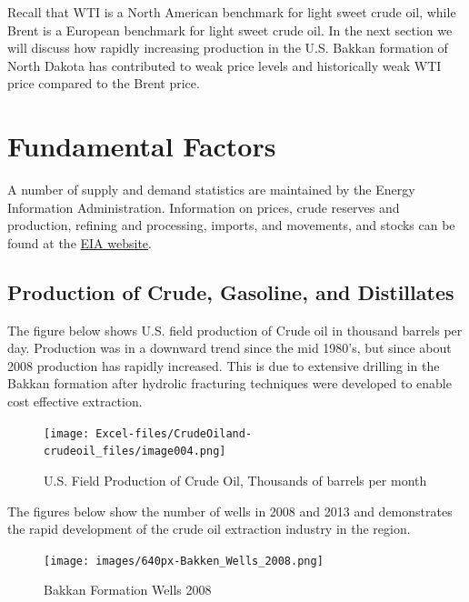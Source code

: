 \documentclass[
  letterpaper,
  DIV=11,
  numbers=noendperiod]{scrreprt}
\begin{document}
Recall that WTI is a North American benchmark for light sweet crude oil,
while Brent is a European benchmark for light sweet crude oil. In the
next section we will discuss how rapidly increasing production in the
U.S. Bakkan formation of North Dakota has contributed to weak price
levels and historically weak WTI price compared to the Brent price.

\hypertarget{fundamental-factors}{%
\section{Fundamental Factors}\label{fundamental-factors}}

A number of supply and demand statistics are maintained by the Energy
Information Administration. Information on prices, crude reserves and
production, refining and processing, imports, and movements, and stocks
can be found at the \href{http://www.eia.gov/petroleum/data.cfm}{EIA
website}.

\hypertarget{production-of-crude-gasoline-and-distillates}{%
\subsection{Production of Crude, Gasoline, and
Distillates}\label{production-of-crude-gasoline-and-distillates}}

The figure below shows U.S. field production of Crude oil in thousand
barrels per day. Production was in a downward trend since the mid
1980's, but since about 2008 production has rapidly increased. This is
due to extensive drilling in the Bakkan formation after hydrolic
fracturing techniques were developed to enable cost effective
extraction.

\begin{figure}

{\centering \texttt{[image: Excel-files/CrudeOiland-crudeoil\_files/image004.png]}

}

\caption{U.S. Field Production of Crude Oil, Thousands of barrels per
month}

\end{figure}

The figures below show the number of wells in 2008 and 2013 and
demonstrates the rapid development of the crude oil extraction industry
in the region.

\begin{figure}

{\centering \texttt{[image: images/640px-Bakken\_Wells\_2008.png]}

}

\caption{Bakkan Formation Wells 2008}

\end{figure}
\end{document}

